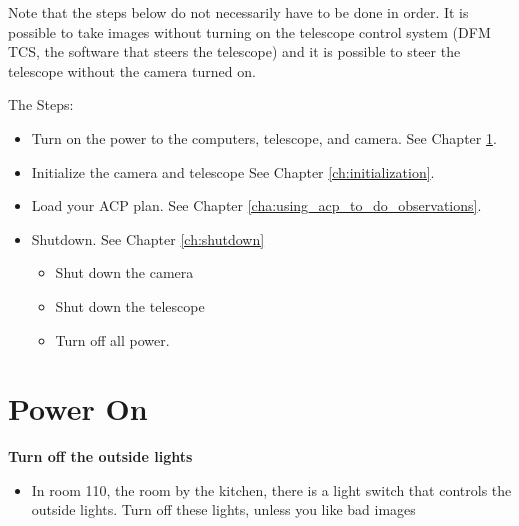 \documentclass[letterpaper, 12pt]{report}
\begin{document}
Note that the steps below do not necessarily have to be done in order. It is possible to take images without turning on the telescope control system (DFM TCS, the software that steers the telescope) and it is possible to steer the telescope without the camera turned on.

The Steps:
\begin{itemize}
	\item Turn on the power to the computers, telescope, and camera. See Chapter \ref{ch:power}.
	\item Initialize the camera and telescope See Chapter \ref{ch:initialization}.
	\item Load your ACP plan. See Chapter \ref{cha:using_acp_to_do_observations}.
	\item Shutdown. See Chapter \ref{ch:shutdown}
	\begin{itemize}
		\item Shut down the camera
		\item Shut down the telescope
		\item Turn off all power.
	\end{itemize}
\end{itemize}

\newpage

\chapter{Power On}\label{ch:power}

\textbf{Turn off the outside lights}
\begin{itemize}
	\item In room 110, the room by the kitchen, there is a light switch that controls the outside lights. Turn off these lights, unless you like bad images
\end{itemize}
\end{document}
